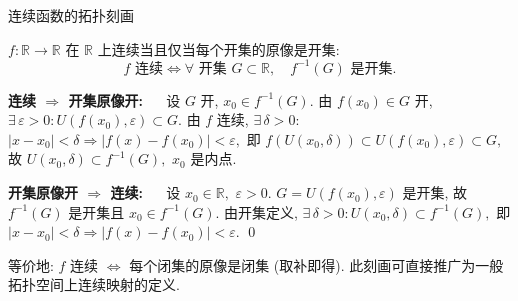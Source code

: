 \begin{frame}{连续函数的拓扑刻画}

\begin{thm}[连续的拓扑刻画]
$f: \mathbb{R} \to \mathbb{R}$ 在 $\mathbb{R}$ 上连续当且仅当每个开集的原像是开集:
\[
f \text{ 连续} \iff \forall \text{ 开集 } G \subset \mathbb{R},\quad f^{-1}(G) \text{ 是开集}.
\]
\end{thm}

\pause
\vspace{0.3em}

\startproof[bg=yellow, fg=red]
\vspace{0.3em}

\textbf{连续 $\Rightarrow$ 开集原像开:} ~~
设 $G$ 开, $x_0 \in f^{-1}(G).$ 由 $f(x_0) \in G$ 开, $\exists\, \varepsilon > 0: U(f(x_0), \varepsilon) \subset G.$ 由 $f$ 连续, $\exists\, \delta > 0:$ $|x - x_0| < \delta \Rightarrow |f(x) - f(x_0)| < \varepsilon,$ 即 $f(U(x_0, \delta)) \subset U(f(x_0), \varepsilon) \subset G,$ 故 $U(x_0, \delta) \subset f^{-1}(G),$ $x_0$ 是内点.

\pause
\vspace{0.5em}

\textbf{开集原像开 $\Rightarrow$ 连续:} ~~
设 $x_0 \in \mathbb{R},$ $\varepsilon > 0.$ $G = U(f(x_0), \varepsilon)$ 是开集, 故 $f^{-1}(G)$ 是开集且 $x_0 \in f^{-1}(G).$ 由开集定义, $\exists\, \delta > 0: U(x_0, \delta) \subset f^{-1}(G),$ 即 $|x - x_0| < \delta \Rightarrow |f(x) - f(x_0)| < \varepsilon.$
\qed

\pause
\vspace{0.5em}

\begin{remark}
等价地: $f$ 连续 $\iff$ 每个\alert{闭集}的原像是闭集 (取补即得). 此刻画可直接推广为一般拓扑空间上连续映射的定义.
\end{remark}

\end{frame}




